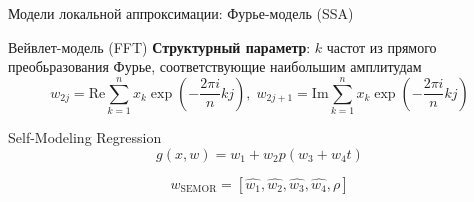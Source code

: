 \documentclass{beamer}
\DeclareMathOperator*{\argmin}{arg\,min}
\begin{document}

\begin{frame}{Модели локальной аппроксимации: Фурье-модель (SSA)}
    \begin{block}{Вейвлет-модель (FFT)}
        \textbf{Структурный параметр}: $k$ частот из прямого преобьразования Фурье,
        соответствующие наибольшим амплитудам
        $$
    w_{2j} = \mathrm{Re} \sum_{k=1}^{n} x_k \exp(-\frac{2\pi i}{n}kj), \; w_{2j + 1} = \mathrm{Im} \sum_{k=1}^{n} x_k \exp(-\frac{2\pi i}{n}kj)
        $$
    \end{block}
    \begin{block}{Self-Modeling Regression}
    $$
    g(x, w) = w_1 + w_2 p(w_3 + w_4t)
    $$

    $$
    w_{\text{SEMOR}} = [\hat{w_1}, \hat{w_2}, \hat{w_3}, \hat{w_4}, \rho]
    $$
    \end{block}
\end{frame}





\end{document}
